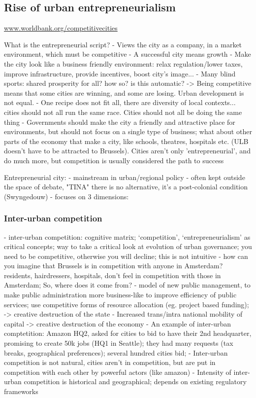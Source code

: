 \documentclass{article}
\begin{document}
\subsection{Rise of urban entrepreneurialism}

\url{www.worldbank.org/competitivecities}

What is the entrepreneurial script?
- Views the city as a company, in a market environment, which must be competitive
- A successful city means growth
- Make the city look like a business friendly environment: relax regulation/lower taxes, improve infrastructure, provide incentives, boost city's image...
- Many blind sports: shared prosperity for all? how so? is this automatic? -> Being competitive means that some cities are winning, and some are losing. Urban development is not equal. 
- One recipe does not fit all, there are diversity of local contexts... cities should not all run the same race. Cities should not all be doing the same thing
- Governments should make the city a friendly and attractive place for environments, but should not focus on a single type of business; what about other parts of the economy that make a city, like schools, theatres, hospitals etc. (ULB doesn't have to be attracted to Brussels).
Cities aren't only 'entrepreneurial', and do much more, but competition is usually considered the path to success

Entrepreneurial city:
- mainstream in urban/regional policy
- often kept outside the space of debate, "TINA" there is no alternative, it's a post-colonial condition (Swyngedouw)
- focuses on 3 dimensions:

\subsubsection{Inter-urban competition}
	- inter-urban competition: cognitive matrix; `competition', `entrepreneurialism' as critical concepts; way to take a critical look at evolution of urban governance; you need to be competitive, otherwise you will decline; 
	this is not intuitive - how can you imagine that Brussels is in competition with anyone in Amsterdam? residents, hairdressers, hospitals, don't feel in competition with those in Amsterdam; 
	So, where does it come from? 
		- model of new public management, to make public administration more business-like to improve efficiency of public services; use competitive forms of resource allocation (eg. project based funding); -> creative destruction of the state
		- Increased trans/intra national mobility of capital -> creative destruction of the economy
	- An example of inter-urban comptetition: Amazon HQ2, asked for cities to bid to have their 2nd headquarter, promising to create 50k jobs (HQ1 in Seattle); they had many requests (tax breaks, geographical preferences); several hundred cities bid;
		- Inter-urban competition is not natural, cities aren't in competition, but are put in competition with each other by powerful actors (like amazon)
		- Intensity of inter-urban competition is historical and geographical; depends on existing regulatory frameworks
	
\end{document}
